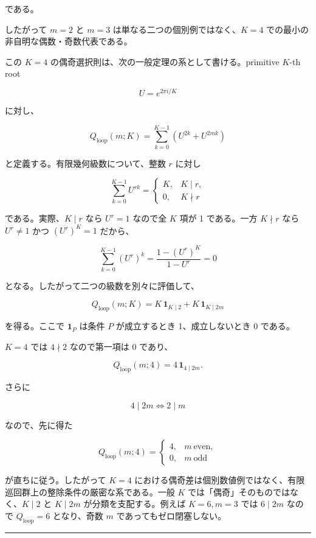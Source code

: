 \documentclass[
  a4paper,
]{ltjsarticle}
\begin{document}
である。

したがって \(m=2\) と \(m=3\) は単なる二つの個別例ではなく、\(K=4\)
での最小の非自明な偶数・奇数代表である。

この \(K=4\) の偶奇選択則は、次の一般定理の系として書ける。primitive
\(K\)-th root

\[
U=e^{2\pi i/K}
\]

に対し、

\[
Q_{\mathrm{loop}}(m;K)
=
\sum_{k=0}^{K-1}
\left(U^{2k}+U^{2mk}\right)
\]

と定義する。有限幾何級数について、整数 \(r\) に対し

\[
\sum_{k=0}^{K-1}U^{rk}
=
\begin{cases}
K,&K\mid r,\\
0,&K\nmid r
\end{cases}
\]

である。実際、\(K\mid r\) なら \(U^r=1\) なので全 \(K\) 項が 1
である。一方 \(K\nmid r\) なら \(U^r\ne1\) かつ \((U^r)^K=1\) だから、

\[
\sum_{k=0}^{K-1}(U^r)^k
=
\frac{1-(U^r)^K}{1-U^r}
=
0
\]

となる。したがって二つの級数を別々に評価して、

\[
\boxed{
Q_{\mathrm{loop}}(m;K)
=
K\,\mathbf 1_{K\mid2}
+
K\,\mathbf 1_{K\mid2m}
}
\]

を得る。ここで \(\mathbf 1_{P}\) は条件 \(P\) が成立するとき
1、成立しないとき 0 である。

\(K=4\) では \(4\nmid2\) なので第一項は 0 であり、

\[
Q_{\mathrm{loop}}(m;4)
=
4\,\mathbf 1_{4\mid2m}.
\]

さらに

\[
4\mid2m
\iff
2\mid m
\]

なので、先に得た

\[
Q_{\mathrm{loop}}(m;4)
=
\begin{cases}
4,&m\ \mathrm{even},\\
0,&m\ \mathrm{odd}
\end{cases}
\]

が直ちに従う。したがって \(K=4\)
における偶奇差は個別数値例ではなく、有限巡回群上の整除条件の厳密な系である。一般
\(K\) では「偶奇」そのものではなく、\(K\mid2\) と \(K\mid2m\)
が分類を支配する。例えば \(K=6,m=3\) では \(6\mid2m\) なので
\(Q_{\mathrm{loop}}=6\) となり、奇数 \(m\) であってもゼロ閉塞しない。

\begin{center}\rule{0.5\linewidth}{0.5pt}\end{center}
\end{document}
